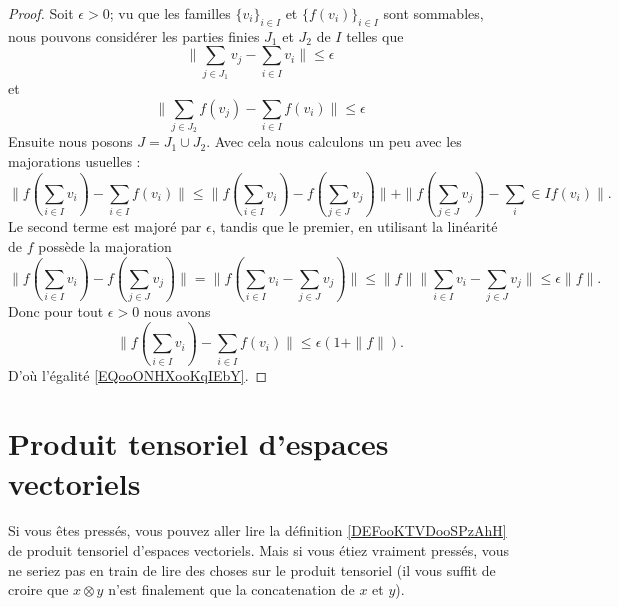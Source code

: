 \begin{proof}
    Soit \( \epsilon>0\); vu que les familles \( \{ v_i \}_{i\in I}\) et \( \{ f(v_i) \}_{i\in I}\) sont sommables, nous pouvons considérer les parties finies \( J_1\) et \( J_2\) de \( I\) telles que
    \begin{equation}
        \big\| \sum_{j\in J_1}v_j-\sum_{i\in I}v_i \big\|\leq \epsilon
    \end{equation}
    et
    \begin{equation}
        \big\| \sum_{j\in J_2}f(v_j)-\sum_{i\in I}f(v_i) \big\|\leq \epsilon
    \end{equation}
    Ensuite nous posons \( J=J_1\cup J_2\). Avec cela nous calculons un peu avec les majorations usuelles :
    \begin{equation}
        \| f(\sum_{i\in I}v_i) -\sum_{i\in I}f(v_i) \|\leq \| f(\sum_{i\in I}v_i)- f(\sum_{j\in J}v_j) \|+  \| f(\sum_{j\in J}v_j)-\sum_i\in If(v_i) \|.
    \end{equation}
    Le second terme est majoré par \( \epsilon\), tandis que le premier, en utilisant la linéarité de \( f\) possède la majoration
    \begin{equation}
        \| f(\sum_{i\in I}v_i)- f(\sum_{j\in J}v_j) \|=\| f(\sum_{i\in I}v_i-\sum_{j\in J}v_j) \|\leq \| f \| \| \sum_{i\in I}v_i- \sum_{j\in J}v_j\|\leq \epsilon\| f \|.
    \end{equation}
    Donc pour tout \( \epsilon>0\) nous avons
    \begin{equation}
        \| f(\sum_{i\in I}v_i) -\sum_{i\in I}f(v_i) \|\leq \epsilon(1+\| f \|).
    \end{equation}
    D'où l'égalité \eqref{EQooONHXooKqIEbY}.
\end{proof}

\section{Produit tensoriel d'espaces vectoriels}

Si vous êtes pressés, vous pouvez aller lire la définition \ref{DEFooKTVDooSPzAhH} de produit tensoriel d'espaces vectoriels. Mais si vous étiez vraiment pressés, vous ne seriez pas en train de lire des choses sur le produit tensoriel (il vous suffit de croire que \( x\otimes y\) n'est finalement que la concatenation de \( x\) et \( y\)).

